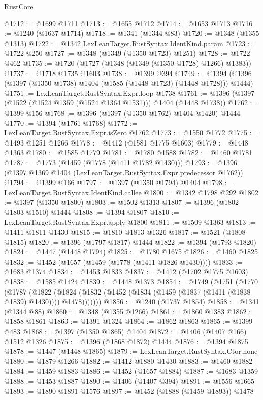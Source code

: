 \begin{lexlean}{RustCore}
\begin{coremodule}
@1712 := @1699 @1711
@1713 := @1655 @1712
@1714 := @1653 @1713
@1716 := @1240 (@1637 @1714)
@1718 := @1341 (@1344 @83)
@1720 := @1348 (@1355 @1313)
@1722 := @1342 LexLeanTarget.RustSyntax.IdentKind.param
@1723 := @1722 @250
@1727 := @1348 (@1349 (@1350 @1723) @1251)
@1728 := @1722 @462
@1735 := @1720 (@1727 (@1348 (@1349 (@1350 @1728) @1266) @1383))
@1737 := @1718 @1735 @1603
@1738 := @1399 @394
@1749 := @1394 (@1396 (@1397 (@1350 @1738) @1404 (@1585 (@1448 @1723) (@1448 @1728))) @1444)
@1751 := LexLeanTarget.RustSyntax.Expr.loop @1738
@1761 := @1396 (@1397 (@1522 (@1524 @1359 (@1524 @1364 @1531))) @1404 (@1448 @1738))
@1762 := @1399 @156
@1768 := @1396 (@1397 (@1350 @1762) @1404 @1420) @1444
@1770 := @1394 (@1761 @1768)
@1772 := LexLeanTarget.RustSyntax.Expr.isZero @1762
@1773 := @1550 @1772
@1775 := @1493 @1251 @1266
@1778 := @1412 (@1581 @1775 @1603)
@1779 := @1448 @1363
@1780 := @1585 @1779
@1781 := @1780 @1588
@1782 := @1460 @1781
@1787 := @1773 (@1459 (@1778 (@1411 @1782 @1430)))
@1793 := @1396 (@1397 @1369 @1404 (LexLeanTarget.RustSyntax.Expr.predecessor @1762))
@1794 := @1399 @166
@1797 := @1397 (@1350 @1794) @1404
@1798 := LexLeanTarget.RustSyntax.IdentKind.callee
@1800 := @1342 @1798 @292
@1802 := @1397 (@1350 @1800)
@1803 := @1502 @1313
@1807 := @1396 (@1802 @1803 @1510) @1444
@1808 := @1394 @1807
@1810 := LexLeanTarget.RustSyntax.Expr.apply @1800
@1811 := @1509 @1363
@1813 := @1411 @1811 @1430
@1815 := @1810 @1813 @1326
@1817 := @1521 (@1808 @1815)
@1820 := @1396 (@1797 @1817) @1444
@1822 := @1394 (@1793 @1820)
@1824 := @1447 (@1448 @1794)
@1825 := @1780 @1675
@1826 := @1460 @1825
@1832 := @1452 (@1657 (@1459 (@1778 (@1411 @1826 @1430))))
@1833 := @1683 @1374
@1834 := @1453 @1833
@1837 := @1412 (@1702 @1775 @1603)
@1838 := @1585 @1424
@1839 := @1448 @1373
@1854 := @1749
    (@1751
      (@1770
        (@1787
          (@1822
            (@1824 (@1832 (@1452 (@1834 (@1459 (@1837 (@1411 (@1838 @1839) @1430)))) @1478)))))))
@1856 := @1240 (@1737 @1854)
@1858 := @1341 (@1344 @88)
@1860 := @1348 (@1355 @1266)
@1861 := @1860 @1383
@1862 := @1858 @1861
@1863 := @1391 @1324
@1864 := @1862 @1863
@1865 := @1399 @483
@1868 := @1397 (@1350 @1865) @1404
@1872 := @1406 (@1407 @166) @1512 @1326
@1875 := @1396 (@1868 @1872) @1444
@1876 := @1394 @1875
@1878 := @1447 (@1448 @1865)
@1879 := LexLeanTarget.RustSyntax.Ctor.none
@1880 := @1879 @1266
@1882 := @1412 @1880 @1430
@1883 := @1460 @1882
@1884 := @1459 @1883
@1886 := @1452 (@1657 @1884)
@1887 := @1683 @1359
@1888 := @1453 @1887
@1890 := @1406 (@1407 @394)
@1891 := @1556 @1665
@1893 := @1890 @1891 @1576
@1897 := @1452 (@1888 (@1459 @1893)) @1478

\end{coremodule}
\end{lexlean}
